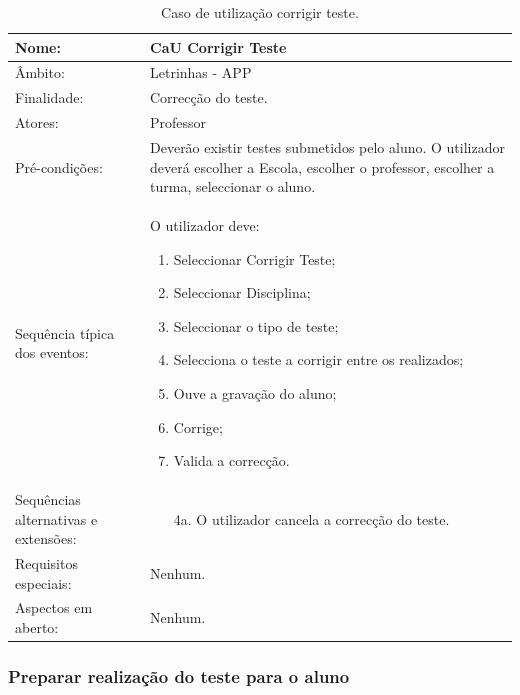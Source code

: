 \documentclass[a4paper]{article}
\begin{document}
				\newpage
				\begin {table}[h]
				\begin{tabular}{|p{2cm} p{10cm}|}
					\hline Nome: & CaU Corrigir Teste \\ 
					\hline Âmbito: & Letrinhas - APP \\ 
					\hline Finalidade: & Correcção do teste. \\ 
					\hline Atores: & Professor \\ 
				    \hline Pré-condições: & Deverão existir testes submetidos pelo  aluno.
					O utilizador deverá escolher a  Escola, escolher o professor, escolher a turma, seleccionar o aluno. \\ 
				    \hline Sequência típica dos eventos: &  					
					O utilizador deve:
				    \begin{enumerate}
				    	\item	Seleccionar Corrigir Teste;
						\item	Seleccionar Disciplina;
						\item	Seleccionar o tipo de teste;
						\item	Selecciona o teste a corrigir entre os realizados;
						\item	Ouve a gravação do aluno;
						\item	Corrige;
						\item	Valida a correcção.
				    \end{enumerate} \\ 
  				    \hline Sequências alternativas e extensões: & 
  				    \begin{enumerate}			    	
  				    	\item[4a.] O utilizador cancela a correcção do teste.
  				    \end{enumerate}
  				     \\ 
  				    \hline Requisitos especiais: & Nenhum.\\ 
  				    \hline Aspectos em aberto: & Nenhum. \\
					\hline 
				\end{tabular}
				\caption{Caso de utilização corrigir teste.}
			\end{table} 
			
		\newpage
				\subsubsection{Preparar realização do teste para o aluno}


				
	
\end{document}
